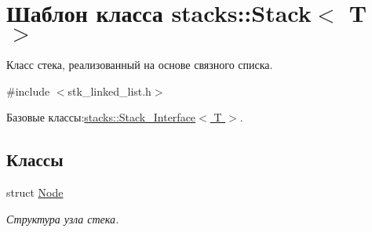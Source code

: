 \hypertarget{classstacks_1_1_stack}{}\section{Шаблон класса stacks\+:\+:Stack$<$ T $>$}
\label{classstacks_1_1_stack}


Класс стека, реализованный на основе связного списка.  




{\ttfamily \#include $<$stk\+\_\+linked\+\_\+list.\+h$>$}



Базовые классы\+:\hyperlink{classstacks_1_1_stack___interface}{stacks\+::\+Stack\+\_\+\+Interface$<$ T $>$}.

\subsection*{Классы}
\begin{DoxyCompactItemize}
\item 
struct \hyperlink{structstacks_1_1_stack_1_1_node}{Node}
\begin{DoxyCompactList}\small\item\em Структура узла стека. \end{DoxyCompactList}\end{DoxyCompactItemize}
